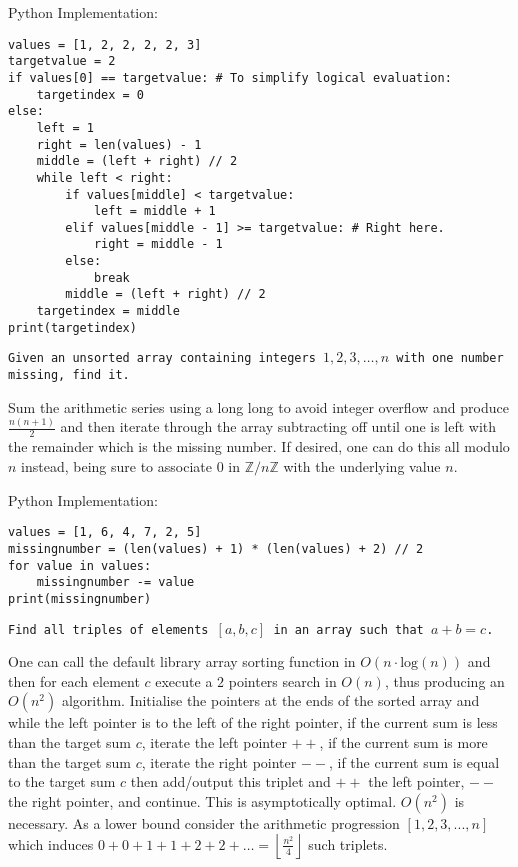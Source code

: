 Python Implementation:

\begin{verbatim}
values = [1, 2, 2, 2, 2, 3]
targetvalue = 2
if values[0] == targetvalue: # To simplify logical evaluation:
    targetindex = 0
else:
    left = 1
    right = len(values) - 1
    middle = (left + right) // 2
    while left < right:
        if values[middle] < targetvalue:
            left = middle + 1
        elif values[middle - 1] >= targetvalue: # Right here.
            right = middle - 1
        else:
            break
        middle = (left + right) // 2
    targetindex = middle
print(targetindex)
\end{verbatim}

\texttt{Given an unsorted array containing integers $1,2,3,\dots,n$ with one number missing, find it.}

Sum the arithmetic series using a long long to avoid integer overflow and produce $\frac{n(n+1)}{2}$ and then iterate through the array subtracting off until one is left with the remainder which is the missing number. If desired, one can do this all modulo $n$ instead, being sure to associate $0$ in $\mathbb{Z}/n\mathbb{Z}$ with the underlying value $n$.

Python Implementation:

\begin{verbatim}
values = [1, 6, 4, 7, 2, 5]
missingnumber = (len(values) + 1) * (len(values) + 2) // 2
for value in values:
    missingnumber -= value
print(missingnumber)
\end{verbatim}

\texttt{Find all triples of elements $[a,b,c]$ in an array such that $a+b=c$.}

One can call the default library array sorting function in $O(n \cdot \text{log}(n))$ and then for each element $c$ execute a $2$ pointers search in $O(n)$, thus producing an $O(n^2)$ algorithm. Initialise the pointers at the ends of the sorted array and while the left pointer is to the left of the right pointer, if the current sum is less than the target sum $c$, iterate the left pointer $++$, if the current sum is more than the target sum $c$, iterate the right pointer $--$, if the current sum is equal to the target sum $c$ then add/output this triplet and $++$ the left pointer, $--$ the right pointer, and continue. This is asymptotically optimal. $O(n^2)$ is necessary. As a lower bound consider the arithmetic progression $[1,2,3,...,n]$ which induces $0+0+1+1+2+2+\dots = \left \lfloor \frac{n^2}{4} \right \rfloor$ such triplets.


